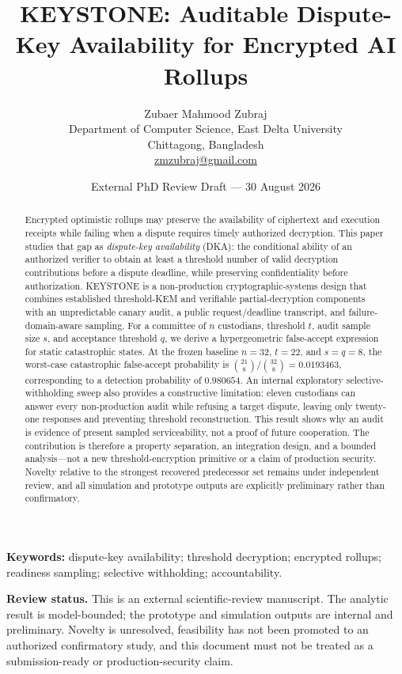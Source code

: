 \documentclass[10pt]{article}
\title{\textbf{KEYSTONE: Auditable Dispute-Key Availability for Encrypted AI Rollups}}
\author{
  Zubaer Mahmood Zubraj\\
  \small Department of Computer Science, East Delta University\\
  \small Chittagong, Bangladesh\\
  \small \href{mailto:zmzubraj@gmail.com}{zmzubraj@gmail.com}
}
\date{External PhD Review Draft --- 30 August 2026}
\begin{document}
\maketitle

\begin{abstract}
Encrypted optimistic rollups may preserve the availability of ciphertext and execution receipts while failing when a dispute requires timely authorized decryption. This paper studies that gap as \emph{dispute-key availability} (DKA): the conditional ability of an authorized verifier to obtain at least a threshold number of valid decryption contributions before a dispute deadline, while preserving confidentiality before authorization. KEYSTONE is a non-production cryptographic-systems design that combines established threshold-KEM and verifiable partial-decryption components with an unpredictable canary audit, a public request/deadline transcript, and failure-domain-aware sampling. For a committee of $n$ custodians, threshold $t$, audit sample size $s$, and acceptance threshold $q$, we derive a hypergeometric false-accept expression for static catastrophic states. At the frozen baseline $n=32$, $t=22$, and $s=q=8$, the worst-case catastrophic false-accept probability is $\binom{21}{8}/\binom{32}{8}=0.0193463$, corresponding to a detection probability of $0.980654$. An internal exploratory selective-withholding sweep also provides a constructive limitation: eleven custodians can answer every non-production audit while refusing a target dispute, leaving only twenty-one responses and preventing threshold reconstruction. This result shows why an audit is evidence of present sampled serviceability, not a proof of future cooperation. The contribution is therefore a property separation, an integration design, and a bounded analysis---not a new threshold-encryption primitive or a claim of production security. Novelty relative to the strongest recovered predecessor set remains under independent review, and all simulation and prototype outputs are explicitly preliminary rather than confirmatory.
\end{abstract}

\noindent\textbf{Keywords:} dispute-key availability; threshold decryption; encrypted rollups; readiness sampling; selective withholding; accountability.

\vspace{0.6em}
\noindent\textbf{Review status.} This is an external scientific-review manuscript. The analytic result is model-bounded; the prototype and simulation outputs are internal and preliminary. Novelty is unresolved, feasibility has not been promoted to an authorized confirmatory study, and this document must not be treated as a submission-ready or production-security claim.
\end{document}
